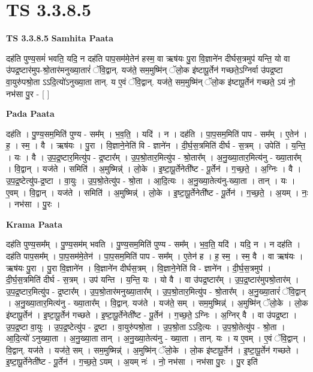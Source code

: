 \documentclass[17pt]{extarticle}
\begin{document}
\section{ TS 3.3.8.5 }

\textbf{TS 3.3.8.5 } \newline
\textbf{Samhita Paata} \newline

दह॑ति पुण्य॒समं॑ भवति॒ यदि॒ न दह॑ति पाप॒सम॑मे॒तेन॑ हस्म॒ वा ऋष॑यः पु॒रा वि॒ज्ञाने॑न दीर्घस॒त्रमुप॑ यन्ति॒ यो वा उ॑पद्र॒ष्टार॑मुप-श्रो॒तार॑मनुख्या॒तारं॑ ॅवि॒द्वान्. यज॑ते॒ सम॒मुष्मि॑न् ॅलो॒क इ॑ष्टापू॒र्तेन॑ गच्छते॒ऽग्निर्वा उ॑पद्र॒ष्टा वा॒युरु॑पश्रो॒ता ऽऽदि॒त्यो॑ऽनुख्या॒ता तान्. य ए॒वं ॅवि॒द्वान्. यज॑ते॒ सम॒मुष्मि॑न् ॅलो॒क इ॑ष्टापू॒र्तेन॑ गच्छते॒ ऽयं नो॒ नभ॑सा पु॒र - [  ] \newline

\textbf{Pada Paata} \newline

दह॑ति । पु॒ण्य॒सम॒मिति॑ पुण्य - सम᳚म् । भ॒व॒ति॒ । यदि॑ । न । दह॑ति । पा॒प॒सम॒मिति॑ पाप - सम᳚म् । ए॒तेन॑ । ह॒ । स्म॒ । वै । ऋष॑यः । पु॒रा । वि॒ज्ञाने॒नेति॑ वि - ज्ञाने॑न । दी॒र्घ॒स॒त्रमिति॑ दीर्घ - स॒त्रम् । उपेति॑ । य॒न्ति॒ । यः । वै । उ॒प॒द्र॒ष्टार॒मित्यु॑प - द्र॒ष्टार᳚म् । उ॒प॒श्रो॒तार॒मित्यु॑प - श्रो॒तार᳚म् । अ॒नु॒ख्या॒तार॒मित्य॑नु - ख्या॒तार᳚म् । वि॒द्वान् । यज॑ते । समिति॑ । अ॒मुष्मिन्न्॑ । लो॒के । इ॒ष्टा॒पू॒र्तेनेती᳚ष्ट - पू॒र्तेन॑ । ग॒च्छ॒ते॒ । अ॒ग्निः । वै । उ॒प॒द्र॒ष्टेत्यु॑प-द्र॒ष्टा । वा॒युः । उ॒प॒श्रो॒तेत्यु॑प - श्रो॒ता । आ॒दि॒त्यः । अ॒नु॒ख्या॒तेत्य॑नु-ख्या॒ता । तान् । यः । ए॒वम् । वि॒द्वान् । यज॑ते । समिति॑ । अ॒मुष्मिन्न्॑ । लो॒के । इ॒ष्टा॒पू॒र्तेनेती᳚ष्ट - पू॒र्तेन॑ । ग॒च्छ॒ते॒ । अ॒यम् । नः॒ । नभ॑सा । पु॒रः ।  \newline


\textbf{Krama Paata} \newline

दह॑ति पुण्य॒सम᳚म् । पु॒ण्य॒सम॑म् भवति । पु॒ण्य॒सम॒मिति॑ पुण्य - सम᳚म् । भ॒व॒ति॒ यदि॑ । यदि॒ न । न दह॑ति । दह॑ति पाप॒सम᳚म् । पा॒प॒सम॑मे॒तेन॑ । पा॒प॒सम॒मिति॑ पाप - सम᳚म् । ए॒तेन॑ ह । ह॒ स्म॒ । स्म॒ वै । वा ऋष॑यः । ऋष॑यः पु॒रा । पु॒रा वि॒ज्ञाने॑न । वि॒ज्ञाने॑न दीर्घस॒त्रम् । वि॒ज्ञाने॒नेति॑ वि - ज्ञाने॑न । दी॒र्घ॒स॒त्रमुप॑ । दी॒र्घ॒स॒त्रमिति॑ दीर्घ - स॒त्रम् । उप॑ यन्ति । य॒न्ति॒ यः । यो वै । वा उ॑पद्र॒ष्टार᳚म् । उ॒प॒द्र॒ष्टार॑मुपश्रो॒तार॑म् । उ॒प॒द्र॒ष्टार॒मित्यु॑प - द्र॒ष्टार᳚म् । उ॒प॒श्रो॒तार॑मनुख्या॒तार᳚म् । उ॒प॒श्रो॒तार॒मित्यु॑प - श्रो॒तार᳚म् । अ॒नु॒ख्या॒तारं॑ ॅवि॒द्वान् । अ॒नु॒ख्या॒तार॒मित्य॑नु - ख्या॒तार᳚म् । वि॒द्वान्. यज॑ते । यज॑ते॒ सम् । सम॒मुष्मिन्न्॑ । अ॒मुष्मि॑न् ॅलो॒के । लो॒क इ॑ष्टापू॒र्तेन॑ । इ॒ष्टा॒पू॒र्तेन॑ गच्छते । इ॒ष्टा॒पू॒र्तेनेती᳚ष्ट - पू॒र्तेन॑ । ग॒च्छ॒ते॒ ऽग्निः । अ॒ग्निर् वै । वा उ॑पद्र॒ष्टा । उ॒प॒द्र॒ष्टा वा॒युः । उ॒प॒द्र॒ष्टेत्यु॑प - द्र॒ष्टा । वा॒युरु॑पश्रो॒ता । उ॒प॒श्रो॒ता ऽऽदि॒त्यः । उ॒प॒श्रो॒तेत्यु॑प - श्रो॒ता । आ॒दि॒त्यो॑ ऽनुख्या॒ता । अ॒नु॒ख्या॒ता तान् । अ॒नु॒ख्या॒तेत्य॑नु - ख्या॒ता । तान्. यः । य ए॒वम् । ए॒वं ॅवि॒द्वान् । वि॒द्वान्. यज॑ते । यज॑ते॒ सम् । सम॒मुष्मिन्न्॑ । अ॒मुष्मि॑न् ॅलो॒के । लो॒क इ॑ष्टापू॒र्तेन॑ । इ॒ष्टा॒पू॒र्तेन॑ गच्छते । इ॒ष्टा॒पू॒र्तेनेती᳚ष्ट - पू॒र्तेन॑ । ग॒च्छ॒ते॒ ऽयम् । अ॒यम् नः॑ । नो॒ नभ॑सा । नभ॑सा पु॒रः । पु॒र इति॑ \newline
\end{document}
